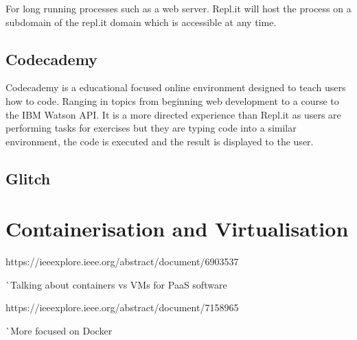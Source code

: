 For long running processes such as a web server. Repl.it will host the process on a subdomain of the repl.it domain which is accessible at any time.

\subsection{Codecademy}
Codecademy is a educational focused online environment designed to teach users how to code. Ranging in topics from beginning web development to a course to the IBM Watson API. It is a more directed experience than Repl.it as users are performing tasks for exercises but they are typing code into a similar environment, the code is executed and the result is displayed to the user.



\subsection{Glitch}

\section{Containerisation and Virtualisation} \label{lit-containers}

https://ieeexplore.ieee.org/abstract/document/6903537

^^ Talking about containers vs VMs for PaaS software

https://ieeexplore.ieee.org/abstract/document/7158965

^^ More focused on Docker

\pagebreak
